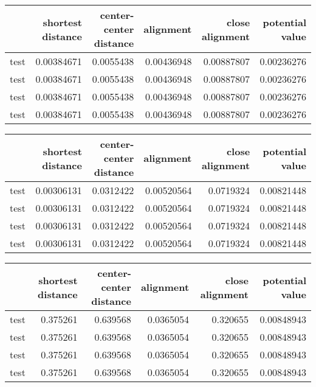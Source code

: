 \begin{tabular}{lrrrrr}
\hline
      &   shortest distance &   center-center distance &   alignment &   close alignment &   potential value \\
\hline
 test &          0.00384671 &                0.0055438 &  0.00436948 &        0.00887807 &        0.00236276 \\
 test &          0.00384671 &                0.0055438 &  0.00436948 &        0.00887807 &        0.00236276 \\
 test &          0.00384671 &                0.0055438 &  0.00436948 &        0.00887807 &        0.00236276 \\
 test &          0.00384671 &                0.0055438 &  0.00436948 &        0.00887807 &        0.00236276 \\
\hline
\end{tabular}

\begin{tabular}{lrrrrr}
\hline
      &   shortest distance &   center-center distance &   alignment &   close alignment &   potential value \\
\hline
 test &          0.00306131 &                0.0312422 &  0.00520564 &         0.0719324 &        0.00821448 \\
 test &          0.00306131 &                0.0312422 &  0.00520564 &         0.0719324 &        0.00821448 \\
 test &          0.00306131 &                0.0312422 &  0.00520564 &         0.0719324 &        0.00821448 \\
 test &          0.00306131 &                0.0312422 &  0.00520564 &         0.0719324 &        0.00821448 \\
\hline
\end{tabular}

\begin{tabular}{lrrrrr}
\hline
      &   shortest distance &   center-center distance &   alignment &   close alignment &   potential value \\
\hline
 test &            0.375261 &                 0.639568 &   0.0365054 &          0.320655 &        0.00848943 \\
 test &            0.375261 &                 0.639568 &   0.0365054 &          0.320655 &        0.00848943 \\
 test &            0.375261 &                 0.639568 &   0.0365054 &          0.320655 &        0.00848943 \\
 test &            0.375261 &                 0.639568 &   0.0365054 &          0.320655 &        0.00848943 \\
\hline
\end{tabular}